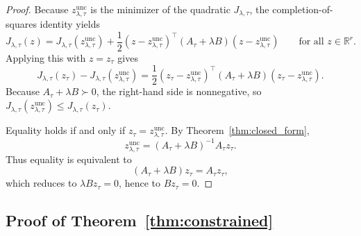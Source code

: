 \documentclass{article}
\newcommand{\RR}{\mathbb{R}}
\begin{document}
\begin{proof}
Because \(z_{\lambda,\tau}^{\mathrm{unc}}\) is the minimizer of the quadratic \(J_{\lambda,\tau}\), the completion-of-squares identity yields
\[
J_{\lambda,\tau}(z)
=
J_{\lambda,\tau}(z_{\lambda,\tau}^{\mathrm{unc}})
+
\frac12 (z-z_{\lambda,\tau}^{\mathrm{unc}})^\top (A_\tau+\lambda B)(z-z_{\lambda,\tau}^{\mathrm{unc}})
\qquad
\text{for all } z\in\RR^r.
\]
Applying this with \(z=z_\tau\) gives
\[
J_{\lambda,\tau}(z_\tau) - J_{\lambda,\tau}(z_{\lambda,\tau}^{\mathrm{unc}})
=
\frac12 (z_\tau-z_{\lambda,\tau}^{\mathrm{unc}})^\top (A_\tau+\lambda B)(z_\tau-z_{\lambda,\tau}^{\mathrm{unc}}).
\]
Because \(A_\tau+\lambda B\succ 0\), the right-hand side is nonnegative, so \(J_{\lambda,\tau}(z_{\lambda,\tau}^{\mathrm{unc}})\le J_{\lambda,\tau}(z_\tau)\).

Equality holds if and only if \(z_\tau=z_{\lambda,\tau}^{\mathrm{unc}}\). By Theorem~\ref{thm:closed_form},
\[
z_{\lambda,\tau}^{\mathrm{unc}}=(A_\tau+\lambda B)^{-1}A_\tau z_\tau.
\]
Thus equality is equivalent to
\[
(A_\tau+\lambda B)z_\tau = A_\tau z_\tau,
\]
which reduces to \(\lambda Bz_\tau=0\), hence to \(Bz_\tau=0\).
\end{proof}

\subsection{Proof of Theorem~\ref{thm:constrained}}
\end{document}
